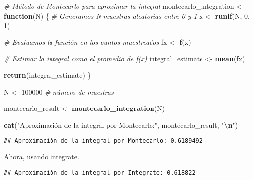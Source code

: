 \documentclass[
]{article}
\newenvironment{Shaded}{\begin{snugshade}}{\end{snugshade}}
\newcommand{\CommentTok}[1]{\textcolor[rgb]{0.56,0.35,0.01}{\textit{#1}}}
\newcommand{\ControlFlowTok}[1]{\textcolor[rgb]{0.13,0.29,0.53}{\textbf{#1}}}
\newcommand{\DecValTok}[1]{\textcolor[rgb]{0.00,0.00,0.81}{#1}}
\newcommand{\FunctionTok}[1]{\textcolor[rgb]{0.13,0.29,0.53}{\textbf{#1}}}
\newcommand{\NormalTok}[1]{#1}
\newcommand{\OtherTok}[1]{\textcolor[rgb]{0.56,0.35,0.01}{#1}}
\newcommand{\SpecialCharTok}[1]{\textcolor[rgb]{0.81,0.36,0.00}{\textbf{#1}}}
\newcommand{\StringTok}[1]{\textcolor[rgb]{0.31,0.60,0.02}{#1}}
\begin{document}
\begin{Shaded}
\begin{Highlighting}[]
\CommentTok{\# Método de Montecarlo para aproximar la integral}
\NormalTok{montecarlo\_integration }\OtherTok{\textless{}{-}} \ControlFlowTok{function}\NormalTok{(N) \{}
  \CommentTok{\# Generamos N muestras aleatorias entre 0 y 1}
\NormalTok{  x }\OtherTok{\textless{}{-}} \FunctionTok{runif}\NormalTok{(N, }\DecValTok{0}\NormalTok{, }\DecValTok{1}\NormalTok{)}
  
  \CommentTok{\# Evaluamos la función en los puntos muestreados}
\NormalTok{  fx }\OtherTok{\textless{}{-}} \FunctionTok{f}\NormalTok{(x)}
  
  \CommentTok{\# Estimar la integral como el promedio de f(x)}
\NormalTok{  integral\_estimate }\OtherTok{\textless{}{-}} \FunctionTok{mean}\NormalTok{(fx)}

  \FunctionTok{return}\NormalTok{(integral\_estimate)}
\NormalTok{\}}

\NormalTok{N }\OtherTok{\textless{}{-}} \DecValTok{100000}  \CommentTok{\# número de muestras}

\NormalTok{montecarlo\_result }\OtherTok{\textless{}{-}} \FunctionTok{montecarlo\_integration}\NormalTok{(N)}

\FunctionTok{cat}\NormalTok{(}\StringTok{"Aproximación de la integral por Montecarlo:"}\NormalTok{, montecarlo\_result, }\StringTok{"}\SpecialCharTok{\textbackslash{}n}\StringTok{"}\NormalTok{)}
\end{Highlighting}
\end{Shaded}

\begin{verbatim}
## Aproximación de la integral por Montecarlo: 0.6189492
\end{verbatim}

Ahora, usando integrate.

\begin{Shaded}
\end{Shaded}

\begin{verbatim}
## Aproximación de la integral por Integrate: 0.618822
\end{verbatim}
\end{document}
